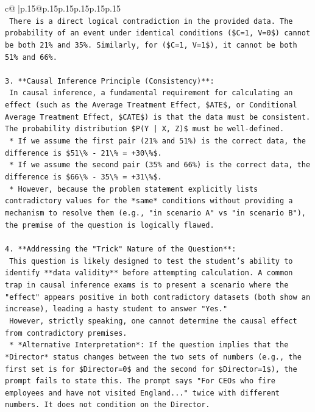 \documentclass{article}
\begin{document}
{\begin{supertabular}{c@{$\;$}|p{.15\linewidth}@{}p{.15\linewidth}p{.15\linewidth}p{.15\linewidth}p{.15\linewidth}p{.15\linewidth}}
{{{\\ 
\texttt{    There is a direct logical contradiction in the provided data. The probability of an event under identical conditions (\$C=1, V=0\$) cannot be both 21\% and 35\%. Similarly, for (\$C=1, V=1\$), it cannot be both 51\% and 66\%.} \\
\\ 
\texttt{3.  **Causal Inference Principle (Consistency)**:} \\
\texttt{    In causal inference, a fundamental requirement for calculating an effect (such as the Average Treatment Effect, \$ATE\$, or Conditional Average Treatment Effect, \$CATE\$) is that the data must be consistent. The probability distribution \$P(Y | X, Z)\$ must be well{-}defined.} \\
\texttt{    *   If we assume the first pair (21\% and 51\%) is the correct data, the difference is \$51\textbackslash{}\% {-} 21\textbackslash{}\% = +30\textbackslash{}\%\$.} \\
\texttt{    *   If we assume the second pair (35\% and 66\%) is the correct data, the difference is \$66\textbackslash{}\% {-} 35\textbackslash{}\% = +31\textbackslash{}\%\$.} \\
\texttt{    *   However, because the problem statement explicitly lists contradictory values for the *same* conditions without providing a mechanism to resolve them (e.g., "in scenario A" vs "in scenario B"), the premise of the question is logically flawed.} \\
\\ 
\texttt{4.  **Addressing the "Trick" Nature of the Question**:} \\
\texttt{    This question is likely designed to test the student's ability to identify **data validity** before attempting calculation. A common trap in causal inference exams is to present a scenario where the "effect" appears positive in both contradictory datasets (both show an increase), leading a hasty student to answer "Yes."} \\
\texttt{    However, strictly speaking, one cannot determine the causal effect from contradictory premises.} \\
\texttt{    *   *Alternative Interpretation*: If the question implies that the *Director* status changes between the two sets of numbers (e.g., the first set is for \$Director=0\$ and the second for \$Director=1\$), the prompt fails to state this. The prompt says "For CEOs who fire employees and have not visited England..." twice with different numbers. It does not condition on the Director.} \\
}}}
\end{supertabular}}
\end{document}
